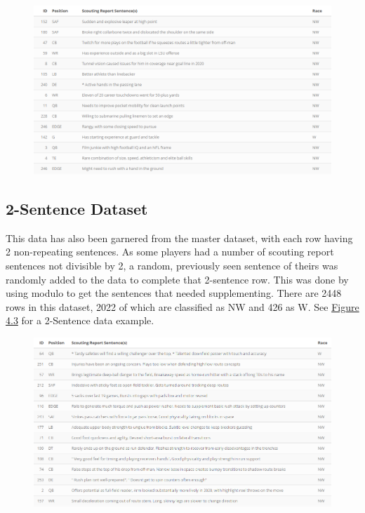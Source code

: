 \documentclass[oneside,12pt]{Classes/RoboticsLaTeX}
\begin{document}
\begin{figure}[hb]
  \centering
  \begin{minipage}{1\textwidth}
    \centering
    \includegraphics[width=1\linewidth]{Figures/1_sentence.png}
    \label{fig:1-sentence_dataset_sample}
  \end{minipage}%
\end{figure}

\subsection{2-Sentence Dataset}
This data has also been garnered from the master dataset, with each row having 2 non-repeating sentences. As some players had a number of scouting report sentences not divisible by 2,
a random, previously seen sentence of theirs was randomly added to the data to complete that 2-sentence row. This was done by using modulo to get the sentences that needed supplementing.
There are 2448 rows in this dataset, 2022 of which are classified as NW and 426 as W. See \hyperref[fig:2-sentence_dataset_sample]{Figure 4.3} for a 2-Sentence data example.

\begin{figure}[htb]
  \centering
  \begin{minipage}{1\textwidth}
    \centering
    \includegraphics[width=1\linewidth]{Figures/2_sentence.png}
    \label{fig:2-sentence_dataset_sample}
  \end{minipage}%
\end{figure}
\end{document}

